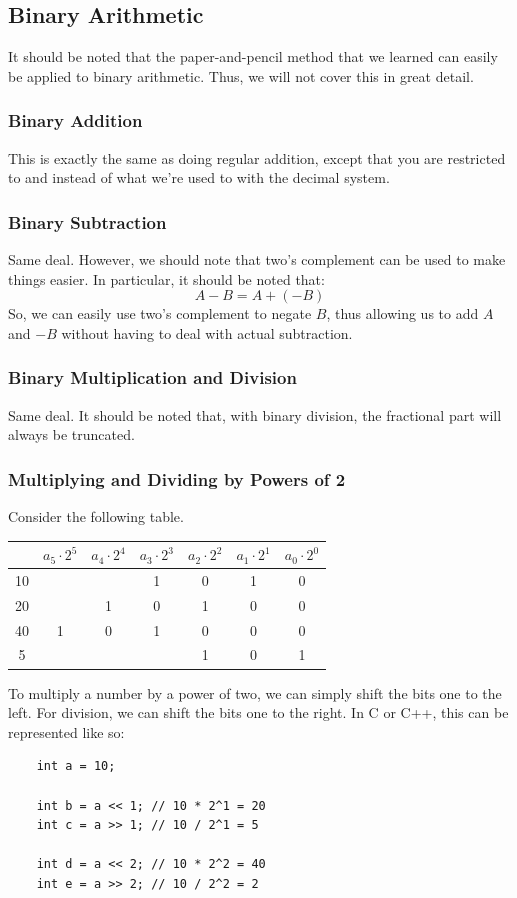 \documentclass[letterpaper]{article}
\begin{document}
\subsection{Binary Arithmetic}
It should be noted that the paper-and-pencil method that we learned can easily be applied to binary arithmetic. Thus, we will not cover this in great detail.

\subsubsection{Binary Addition}
This is exactly the same as doing regular addition, except that you are restricted to  and  instead of what we're used to with the decimal system. 

\subsubsection{Binary Subtraction}
Same deal. However, we should note that two's complement can be used to make things easier. In particular, it should be noted that:
\[A - B = A + (-B)\]
So, we can easily use two's complement to negate $B$, thus allowing us to add $A$ and $-B$ without having to deal with actual subtraction.

\subsubsection{Binary Multiplication and Division}
Same deal. It should be noted that, with binary division, the fractional part will always be truncated. 

\subsubsection{Multiplying and Dividing by Powers of 2}
Consider the following table.
\begin{center}
    \begin{tabular}{c|c|c|c|c|c|c}
            & $a_5 \cdot 2^5$ & $a_4 \cdot 2^4$ & $a_3 \cdot 2^3$ & $a_2 \cdot 2^2$ & $a_1 \cdot 2^1$ & $a_0 \cdot 2^0$ \\
            \hline
            10 &  & & 1 & 0 & 1 & 0 \\
            20 & & 1 & 0 & 1 & 0 & 0 \\
            40 & 1 & 0 & 1 & 0 & 0 & 0 \\
            5  & & & & 1 & 0 & 1
    \end{tabular}
\end{center}
To multiply a number by a power of two, we can simply shift the bits one to the left. For division, we can shift the bits one to the right. In C or C++, this can be represented like so:
\begin{verbatim}
    int a = 10;
    
    int b = a << 1; // 10 * 2^1 = 20
    int c = a >> 1; // 10 / 2^1 = 5 

    int d = a << 2; // 10 * 2^2 = 40
    int e = a >> 2; // 10 / 2^2 = 2
\end{verbatim}
\end{document}
